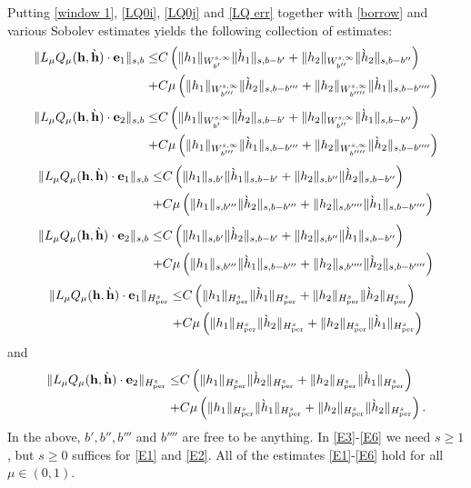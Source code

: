 \documentclass[12pt]{amsart}
\numberwithin{equation}{section}
\newcommand{\per}{{\text{per}}}
\newcommand{\be}{\begin{equation}}
\newcommand{\ee}{\end{equation}}
\newcommand{\hb}{{\bf{h}}}
\newcommand{\jb}{{{\bf{e}}_2}}
\newcommand{\ib}{{{\bf{e}}_1}}
\begin{document}
Putting  \eqref{window 1}, \eqref{LQ0i}, \eqref{LQ0j} and \eqref{LQ err} together with \eqref{borrow} and various Sobolev 
estimates yields the following collection of estimates:
\be\label{E1}\begin{split}
\| L_\mu Q_\mu(\hb,\grave{\hb}) \cdot \ib\|_{s,b} \le &C \left(
\| h_1\|_{W^{s,\infty}_{b'}} \| \grave{h}_1\|_{s,b-b'} + 
\| h_2\|_{W^{s,\infty}_{b''}} \| \grave{h}_2\|_{s,b-b''} \right)\\ + &C\mu \left( 
 \| h_1\|_{W^{s,\infty}_{b'''}} \| \grave{h}_2\|_{s,b-b'''} 
+  \| h_2\|_{W^{s,\infty}_{b''''}} \| \grave{h}_1\|_{s,b-b''''} 
\right)
\end{split}\ee
\be\label{E2}\begin{split}
\| L_\mu Q_\mu(\hb,\grave{\hb}) \cdot \jb\|_{s,b} \le &C \left( 
 \| h_1\|_{W^{s,\infty}_{b'}} \| \grave{h}_2\|_{s,b-b'} 
+  \| h_2\|_{W^{s,\infty}_{b''}} \| \grave{h}_1\|_{s,b-b''} 
 \right)\\ + &C\mu \left( 
 \| h_1\|_{W^{s,\infty}_{b'''}} \| \grave{h}_1\|_{s,b-b'''} + 
\| h_2\|_{W^{s,\infty}_{b''''}} \| \grave{h}_2\|_{s,b-b''''}
\right)
\end{split}\ee
\be\label{E3}\begin{split}
\| L_\mu Q_\mu(\hb,\grave{\hb}) \cdot \ib\|_{s,b} \le &C \left(
\| h_1\|_{s,b'} \| \grave{h}_1\|_{s,b-b'} + 
\| h_2\|_{{s,b''}} \| \grave{h}_2\|_{s,b-b''} \right)\\ + &C\mu \left( 
 \| h_1\|_{s,b'''} \| \grave{h}_2\|_{s,b-b'''} 
+  \| h_2\|_{{s,b''''}} \| \grave{h}_1\|_{s,b-b''''} 
\right)
\end{split}\ee
\be\label{E4}\begin{split}
\| L_\mu Q_\mu(\hb,\grave{\hb}) \cdot \jb\|_{s,b} \le &C \left(
 \| h_1\|_{s,b'} \| \grave{h}_2\|_{s,b-b'} 
+  \| h_2\|_{{s,b''}} \| \grave{h}_1\|_{s,b-b''} 
 \right)\\ + &C\mu \left( 
\| h_1\|_{s,b'''} \| \grave{h}_1\|_{s,b-b'''} + 
\| h_2\|_{{s,b''''}} \| \grave{h}_2\|_{s,b-b''''}
\right)
\end{split}\ee
\be\label{E5}\begin{split}
\| L_\mu Q_\mu(\hb,\grave{\hb}) \cdot \ib\|_{H^s_\per} \le &C \left(
\| h_1\|_{H^s_\per} \| \grave{h}_1\|_{H^s_\per} + 
\| h_2\|_{H^s_\per} \| \grave{h}_2\|_{H^s_\per} \right)\\ + &C\mu \left( 
 \| h_1\|_{H^s_\per} \| \grave{h}_2\|_{H^s_\per} 
+  \| h_2\|_{{H^s_\per}} \| \grave{h}_1\|_{H^s_\per} 
\right)
\end{split}\ee
and
\be\label{E6}\begin{split}
\| L_\mu Q_\mu(\hb,\grave{\hb}) \cdot \jb\|_{H^s_\per} \le &C \left(
 \| h_1\|_{H^s_\per} \| \grave{h}_2\|_{H^s_\per} 
+  \| h_2\|_{H^s_\per} \| \grave{h}_1\|_{H^s_\per} 
 \right)\\ + &C\mu \left( 
\| h_1\|_{H^s_\per} \| \grave{h}_1\|_{H^s_\per} + 
\| h_2\|_{{H^s_\per}} \| \grave{h}_2\|_{H^s_\per}
\right).
\end{split}\ee
In the above, $b',b'',b'''$ and $b''''$ are free to be anything.
 In \eqref{E3}-\eqref{E6} we need $s \ge 1$,
but $s \ge 0$ suffices for \eqref{E1} and \eqref{E2}.
All of the estimates \eqref{E1}-\eqref{E6}  hold for all $\mu \in (0,1)$.
\end{document}
